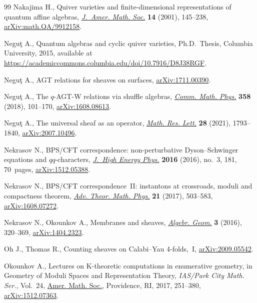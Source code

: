 \documentclass[10pt,a4paper]{amsart}
\numberwithin{equation}{section}
\begin{document}
\begin{thebibliography}{99}
Nakajima H., Quiver varieties and finite-dimensional representations of quantum
 affine algebras, \href{https://doi.org/10.1090/S0894-0347-00-00353-2}{\textit{J.~Amer. Math. Soc.}} \textbf{14} (2001), 145--238,
 \href{https://arxiv.org/abs/math.QA/9912158}{arXiv:math.QA/9912158}.

Negu\c{t} A., Quantum algebras and cyclic quiver varieties, Ph.D.~Thesis,
 {C}olumbia University, 2015, available at
 \url{https://academiccommons.columbia.edu/doi/10.7916/D8J38RGF}.

Negu\c{t} A., {AGT} relations for sheaves on surfaces, \href{https://arxiv.org/abs/1711.00390}{arXiv:1711.00390}.

Negu\c{t} A., The $q$-{AGT}-{W} relations via shuffle algebras, \href{https://doi.org/10.1007/s00220-018-3102-3}{\textit{Comm.
 Math. Phys.}} \textbf{358} (2018), 101--170, \href{https://arxiv.org/abs/1608.08613}{arXiv:1608.08613}.

Negu\c{t} A., The universal sheaf as an operator, \href{https://doi.org/10.48550/arXiv.2007.10496}{\textit{Math. Res. Lett.}}
 \textbf{28} (2021), 1793--1840, \href{https://arxiv.org/abs/2007.10496}{arXiv:2007.10496}.

Nekrasov N., BPS/CFT correspondence: non-perturbative {D}yson--{S}chwinger
 equations and $qq$-characters, \href{https://doi.org/10.1007/JHEP03(2016)181}{\textit{J.~High Energy Phys.}} \textbf{2016}
 (2016), no.~3, 181, 70~pages, \href{https://arxiv.org/abs/1512.05388}{arXiv:1512.05388}.

Nekrasov N., B{PS}/{CFT} correspondence~{II}: instantons at crossroads, moduli
 and compactness theorem, \href{https://doi.org/10.4310/ATMP.2017.v21.n2.a4}{\textit{Adv. Theor. Math. Phys.}} \textbf{21} (2017),
 503--583, \href{https://arxiv.org/abs/1608.07272}{arXiv:1608.07272}.

Nekrasov N., Okounkov A., Membranes and sheaves, \href{https://doi.org/10.14231/AG-2016-015}{\textit{Algebr. Geom.}}
 \textbf{3} (2016), 320--369, \href{https://arxiv.org/abs/1404.2323}{arXiv:1404.2323}.

Oh J., Thomas R., Counting sheaves on {C}alabi--{Y}au 4-folds,~I,
 \href{https://arxiv.org/abs/2009.05542}{arXiv:2009.05542}.

Okounkov A., Lectures on {K}-theoretic computations in enumerative geometry, in
 Geometry of Moduli Spaces and Representation Theory, \textit{IAS/Park City
 Math. Ser.}, Vol.~24, \href{https://doi.org/10.1090/pcms/024}{Amer. Math. Soc.}, Providence, RI, 2017, 251--380,
 \href{https://arxiv.org/abs/1512.07363}{arXiv:1512.07363}.


\end{thebibliography}
\end{document}
